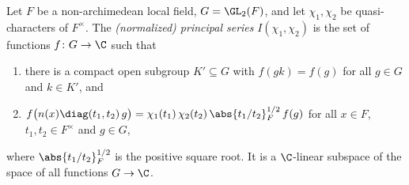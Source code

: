 Let $F$ be a non-archimedean local field, $G=\GL_2(F)$, and let $\chi_1,\chi_2$ be quasi-characters of $F^\times$. The
\emph{(normalized) principal series} $I(\chi_1,\chi_2)$ is the set of functions $f\colon G\to\C$ such that
\begin{enumerate}[label=(\roman*)]
\item there is a compact open subgroup $K'\subseteq G$ with $f(gk)=f(g)$ for all $g\in G$ and $k\in K'$, and
\item $f\bigl(n(x)\diag(t_1,t_2)\,g\bigr)=\chi_1(t_1)\,\chi_2(t_2)\,\abs{t_1/t_2}_F^{1/2}\,f(g)$ for all $x\in F$,
  $t_1,t_2\in F^\times$ and $g\in G$,
\end{enumerate}
where $\abs{t_1/t_2}_F^{1/2}$ is the positive square root. It is a $\C$-linear subspace of the space of all functions
$G\to\C$.
